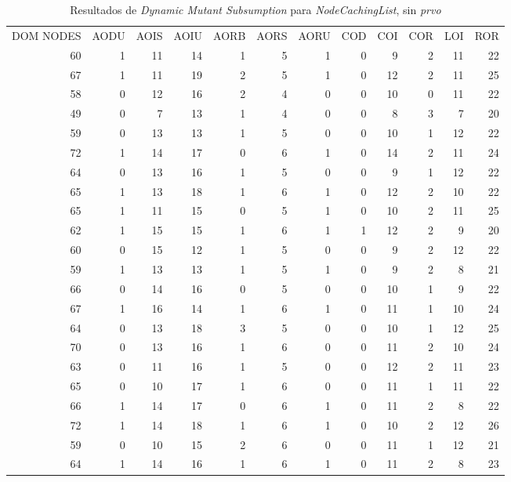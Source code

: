 \begin{table}[]
	\caption{Resultados de \emph{Dynamic Mutant Subsumption} para \emph{NodeCachingList}, sin \emph{prvo}}
	\label{tables.results.subsumption.ncll.noprvo}
	\centering
	\scriptsize
	\def\arraystretch{0.95}
	\setlength\tabcolsep{0.5mm}
	\begin{tabular}{rrrrrrrrrrrr}
		DOM NODES & AODU & AOIS & AOIU & AORB & AORS & AORU & COD & COI & COR & LOI & ROR \\
		60 & 1 & 11 & 14 & 1 & 5 & 1 & 0 & 9 & 2 & 11 & 22 \\
		67 & 1 & 11 & 19 & 2 & 5 & 1 & 0 & 12 & 2 & 11 & 25 \\
		58 & 0 & 12 & 16 & 2 & 4 & 0 & 0 & 10 & 0 & 11 & 22 \\
		49 & 0 & 7 & 13 & 1 & 4 & 0 & 0 & 8 & 3 & 7 & 20 \\
		59 & 0 & 13 & 13 & 1 & 5 & 0 & 0 & 10 & 1 & 12 & 22 \\
		72 & 1 & 14 & 17 & 0 & 6 & 1 & 0 & 14 & 2 & 11 & 24 \\
		64 & 0 & 13 & 16 & 1 & 5 & 0 & 0 & 9 & 1 & 12 & 22 \\
		65 & 1 & 13 & 18 & 1 & 6 & 1 & 0 & 12 & 2 & 10 & 22 \\
		65 & 1 & 11 & 15 & 0 & 5 & 1 & 0 & 10 & 2 & 11 & 25 \\
		62 & 1 & 15 & 15 & 1 & 6 & 1 & 1 & 12 & 2 & 9 & 20 \\
		60 & 0 & 15 & 12 & 1 & 5 & 0 & 0 & 9 & 2 & 12 & 22 \\
		59 & 1 & 13 & 13 & 1 & 5 & 1 & 0 & 9 & 2 & 8 & 21 \\
		66 & 0 & 14 & 16 & 0 & 5 & 0 & 0 & 10 & 1 & 9 & 22 \\
		67 & 1 & 16 & 14 & 1 & 6 & 1 & 0 & 11 & 1 & 10 & 24 \\
		64 & 0 & 13 & 18 & 3 & 5 & 0 & 0 & 10 & 1 & 12 & 25 \\
		70 & 0 & 13 & 16 & 1 & 6 & 0 & 0 & 11 & 2 & 10 & 24 \\
		63 & 0 & 11 & 16 & 1 & 5 & 0 & 0 & 12 & 2 & 11 & 23 \\
		65 & 0 & 10 & 17 & 1 & 6 & 0 & 0 & 11 & 1 & 11 & 22 \\
		66 & 1 & 14 & 17 & 0 & 6 & 1 & 0 & 11 & 2 & 8 & 22 \\
		72 & 1 & 14 & 18 & 1 & 6 & 1 & 0 & 10 & 2 & 12 & 26 \\
		59 & 0 & 10 & 15 & 2 & 6 & 0 & 0 & 11 & 1 & 12 & 21 \\
		64 & 1 & 14 & 16 & 1 & 6 & 1 & 0 & 11 & 2 & 8 & 23 \\

\end{tabular}
\end{table}
